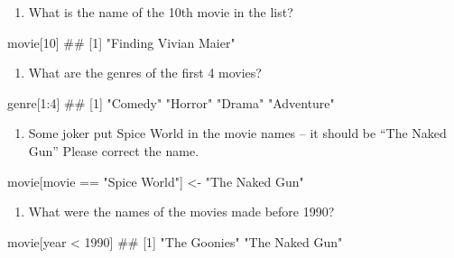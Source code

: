 \documentclass[]{book}
\newenvironment{Shaded}{\begin{snugshade}}{\end{snugshade}}
\newcommand{\DecValTok}[1]{\textcolor[rgb]{0.00,0.00,0.81}{{#1}}}
\newcommand{\StringTok}[1]{\textcolor[rgb]{0.31,0.60,0.02}{{#1}}}
\newcommand{\NormalTok}[1]{{#1}}
\providecommand{\tightlist}{%
  \setlength{\itemsep}{0pt}\setlength{\parskip}{0pt}}
\theoremstyle{definition}
\theoremstyle{definition}
\theoremstyle{remark}
\begin{document}
\begin{enumerate}
\def\labelenumi{\arabic{enumi}.}
\tightlist
\item
  What is the name of the 10th movie in the list?
\end{enumerate}

\begin{Shaded}
\begin{Highlighting}[]
\NormalTok{movie[}\DecValTok{10}\NormalTok{]}
\NormalTok{## [1] "Finding Vivian Maier"}
\end{Highlighting}
\end{Shaded}

\begin{enumerate}
\def\labelenumi{\arabic{enumi}.}
\setcounter{enumi}{1}
\tightlist
\item
  What are the genres of the first 4 movies?
\end{enumerate}

\begin{Shaded}
\begin{Highlighting}[]
\NormalTok{genre[}\DecValTok{1}\NormalTok{:}\DecValTok{4}\NormalTok{]}
\NormalTok{## [1] "Comedy"    "Horror"    "Drama"     "Adventure"}
\end{Highlighting}
\end{Shaded}

\begin{enumerate}
\def\labelenumi{\arabic{enumi}.}
\setcounter{enumi}{2}
\tightlist
\item
  Some joker put Spice World in the movie names -- it should be ``The
  Naked Gun'' Please correct the name.
\end{enumerate}

\begin{Shaded}
\begin{Highlighting}[]
\NormalTok{movie[movie ==}\StringTok{ "Spice World"}\NormalTok{] <-}\StringTok{ "The Naked Gun"}
\end{Highlighting}
\end{Shaded}

\begin{enumerate}
\def\labelenumi{\arabic{enumi}.}
\setcounter{enumi}{3}
\tightlist
\item
  What were the names of the movies made before 1990?
\end{enumerate}

\begin{Shaded}
\begin{Highlighting}[]
\NormalTok{movie[year <}\StringTok{ }\DecValTok{1990}\NormalTok{]}
\NormalTok{## [1] "The Goonies"   "The Naked Gun"}
\end{Highlighting}
\end{Shaded}
\end{document}
